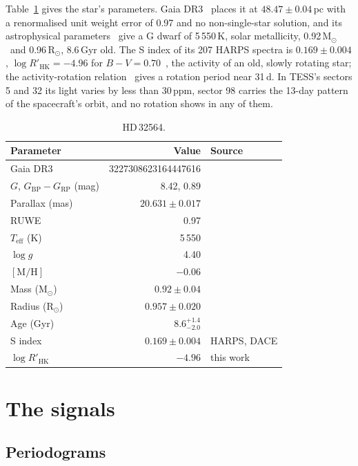 \documentclass[3p,11pt]{elsarticle}
\newcommand{\Msun}{M$_\odot$}
\newcommand{\Rsun}{R$_\odot$}
\begin{document}
Table~\ref{tab:star} gives the star's parameters. Gaia DR3~\cite{GaiaDR3} places it at
$48.47 \pm 0.04$\,pc with a renormalised unit weight error of 0.97 and no non-single-star solution,
and its astrophysical parameters~\cite{Creevey2023} give a G dwarf of 5\,550\,K, solar metallicity,
0.92\,\Msun\ and 0.96\,\Rsun, 8.6\,Gyr old. The S index of its 207 HARPS spectra is $0.169 \pm 0.004$,
$\log R'_\mathrm{HK} = -4.96$ for $B-V = 0.70$~\cite{Noyes1984}, the activity of an old, slowly
rotating star; the activity-rotation relation~\cite{Mamajek2008} gives a rotation period near 31\,d. In
TESS's sectors 5 and 32 its light varies by less than 30\,ppm, sector 98 carries the 13-day pattern of
the spacecraft's orbit, and no rotation shows in any of them.

\begin{table}[!htbp]
\centering
\caption{HD\,32564.}\label{tab:star}
\begin{tabular}{l r l}
\toprule
Parameter & Value & Source \\
\midrule
Gaia DR3 & 3227308623164447616 & \cite{GaiaDR3} \\
$G$, $G_\mathrm{BP} - G_\mathrm{RP}$ (mag) & 8.42, 0.89 & \cite{GaiaDR3} \\
Parallax (mas) & $20.631 \pm 0.017$ & \cite{GaiaDR3} \\
RUWE & 0.97 & \cite{GaiaDR3} \\
$T_\mathrm{eff}$ (K) & 5\,550 & \cite{Creevey2023} \\
$\log g$ & 4.40 & \cite{Creevey2023} \\
$[\mathrm{M/H}]$ & $-0.06$ & \cite{Creevey2023} \\
Mass (\Msun) & $0.92 \pm 0.04$ & \cite{Creevey2023} \\
Radius (\Rsun) & $0.957 \pm 0.020$ & \cite{Creevey2023} \\
Age (Gyr) & $8.6^{+1.4}_{-2.0}$ & \cite{Creevey2023} \\
S index & $0.169 \pm 0.004$ & HARPS, DACE \\
$\log R'_\mathrm{HK}$ & $-4.96$ & this work \\
\bottomrule
\end{tabular}
\end{table}

\section{The signals}\label{sec:signals}

\subsection{Periodograms}
\end{document}
